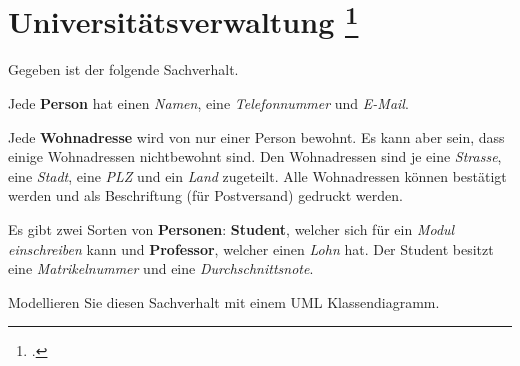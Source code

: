 \documentclass{bschlangaul-aufgabe}
\begin{document}
\section{Universitätsverwaltung
\footcite[Seite 4]{net:pdf:uzh-zuerich:uebung-4}}

Gegeben ist der folgende Sachverhalt.

Jede \textbf{Person} hat einen \emph{Namen}, eine \emph{Telefonnummer}
und \emph{E-Mail}.

Jede \textbf{Wohnadresse} wird von nur einer Person bewohnt. Es kann
aber sein, dass einige Wohnadressen nichtbewohnt sind. Den Wohnadressen
sind je eine \emph{Strasse}, eine \emph{Stadt}, eine \emph{PLZ} und ein
\emph{Land} zugeteilt. Alle Wohnadressen können bestätigt werden und als
Beschriftung (für Postversand) gedruckt werden.

Es gibt zwei Sorten von \textbf{Personen}: \textbf{Student}, welcher
sich für ein \emph{Modul einschreiben} kann und \textbf{Professor},
welcher einen \emph{Lohn} hat. Der Student besitzt eine
\emph{Matrikelnummer} und eine \emph{Durchschnittsnote}.

Modellieren Sie diesen Sachverhalt mit einem UML Klassendiagramm.

\end{document}
